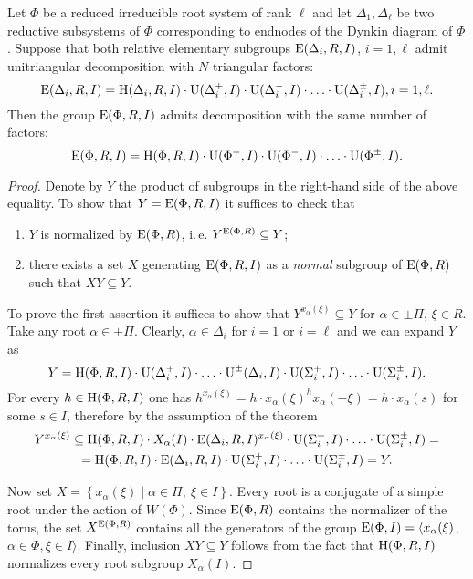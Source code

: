 \begin{thm}\label{thm:Gauss}
Let $\Phi$ be a reduced irreducible root system of rank $\ell$ and let $\Delta_1, \Delta_\ell$ be
two reductive subsystems of $\Phi$ corresponding to endnodes of the Dynkin diagram of $\Phi$.
Suppose that both relative elementary subgroups $\operatorname{E}(\Delta_i, R, I)$, $i=1,\ell$ admit unitriangular decomposition with $N$ triangular factors:
\[ \operatorname{E}(\Delta_i, R, I) = \operatorname{H}(\Delta_i, R, I) \cdot \operatorname{U}(\Delta^+_i, I) \cdot \operatorname{U}(\Delta^-_i, I) \cdot \ldots \cdot \operatorname{U}(\Delta^\pm_i, I), i=1,\ell. \]
Then the group $\operatorname{E}(\Phi, R, I)$ admits decomposition with the same number of factors:
\begin{equation} \nonumber\operatorname{E}(\Phi, R, I) = \operatorname{H}(\Phi,R,I) \cdot \operatorname{U}(\Phi^+,I) \cdot \operatorname{U}(\Phi^-, I) \cdot \ldots \cdot \operatorname{U}(\Phi^\pm,I). \end{equation}
\end{thm}
\begin{proof}
Denote by $Y$ the product of subgroups in the right-hand side of the above equality.
To show that $Y=\operatorname{E}(\Phi,R,I)$ it suffices to check that
\begin{enumerate}
\item $Y$ is normalized by $\operatorname{E}(\Phi,R)$, i.\,e. $Y^{\operatorname{E}(\Phi,R)}\subseteq Y$;
\item there exists a set $X$ generating $\operatorname{E}(\Phi,R,I)$ as a \emph{normal} subgroup of $\operatorname{E}(\Phi,R)$ such that $XY\subseteq Y$.
\end{enumerate}
To prove the first assertion it suffices to show that $Y^{x_\alpha(\xi)} \subseteq Y$ for $\alpha\in \pm \Pi$, $\xi\in R$.
Take any root $\alpha\in\pm\Pi$. Clearly, $\alpha \in \Delta_i$ for $i=1$ or $i=\ell$ and we can expand $Y$ as
\[ Y=\operatorname{H}(\Phi,R,I) \cdot \operatorname{U}(\Delta_i^+,I) \cdot \ldots \cdot \operatorname{U}^\pm(\Delta_i,I) \cdot \operatorname{U}(\Sigma_i^+,I) \cdot \ldots \cdot \operatorname{U}(\Sigma_i^\pm,I). \]
For every  $h \in \operatorname{H}(\Phi, R, I)$ one has $h^{x_\alpha(\xi)} = h \cdot x_\alpha(\xi)^h x_\alpha(-\xi) = h \cdot x_\alpha(s)$ for some $s\in I$, therefore by the assumption of the theorem
\begin{multline*}
Y^{x_\alpha(\xi)} \subseteq \operatorname{H}(\Phi,R,I) \cdot X_{\alpha}(I) \cdot \operatorname{E}(\Delta_i,R,I)^{x_\alpha(\xi)} \cdot \operatorname{U}(\Sigma^+_i,I) \cdot \ldots \cdot \operatorname{U}(\Sigma^\pm_i,I) =\\
= \operatorname{H}(\Phi, R, I) \cdot \operatorname{E}(\Delta_i,R,I) \cdot \operatorname{U}(\Sigma^+_i,I) \cdot \ldots \cdot \operatorname{U}(\Sigma^\pm_i,I) = Y.
\end{multline*}

Now set $X=\left\{x_\alpha(\xi)\mid\alpha\in\Pi,\ \xi\in I \right\}$. 
Every root is a conjugate of a simple root under the action of $W(\Phi)$.
Since $\operatorname{E}(\Phi,R)$ contains the normalizer of the torus, the set $X^{\operatorname{E}(\Phi,R)}$ contains all the generators of the group $\operatorname{E}(\Phi, I) = \langle x_\alpha(\xi)$, $\alpha\in\Phi, \xi\in I \rangle$.
Finally, inclusion $XY \subseteq Y$ follows from the fact that $\operatorname{H}(\Phi,R,I)$ normalizes every root subgroup $X_\alpha(I)$.

\end{proof}
